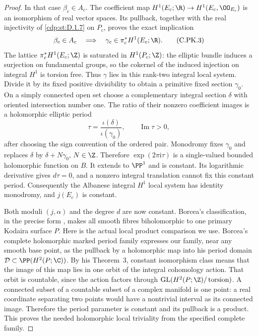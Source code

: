 \begin{proof}
In that case $\beta_c\in A_c$. The coefficient map
$H^1(E_c;\R)\to H^1(E_c,\OO_{E_c})$ is an isomorphism
of real vector spaces. Its pullback, together with the real
injectivity of \ref{cdp:st:D.1.7} on $P_c$, proves the exact implication
\[
 \beta_c\in A_c
 \quad\Longrightarrow\quad
 \gamma_c\in\pi_c^*H^1(E_c;\R).
\tag{C.PK.3}\label{cdp:eq:C.PK.3}
\]
The lattice $\pi_c^*H^1(E_c;\Z)$ is saturated in
$H^1(P_c;\Z)$: the elliptic bundle induces a surjection
on fundamental groups, so the cokernel of the induced
injection on integral $H^1$ is torsion free. Thus $\gamma$
lies in this rank-two integral local system. Divide it by
its fixed positive divisibility to obtain a primitive fixed
section $\gamma_0$. On a simply connected open set choose
a complementary integral section $\delta$ with oriented
intersection number one. The ratio of their nonzero
coefficient images is a holomorphic elliptic period
\[
 \tau=\frac{\iota(\delta)}{\iota(\gamma_0)},
 \qquad \operatorname{Im}\tau>0,
\]
after choosing the sign convention of the ordered pair.
Monodromy fixes $\gamma_0$ and replaces $\delta$ by
$\delta+N\gamma_0$, $N\in\Z$. Therefore
$\exp(2\pi\mathrm i\tau)$ is a single-valued bounded
holomorphic function on $B$. It extends to $\PP^1$ and
is constant. Its logarithmic derivative gives $d\tau=0$,
and a nonzero integral translation cannot fix this constant
period. Consequently the Albanese integral $H^1$ local
system has identity monodromy, and $j(E_c)$ is constant.

Both moduli $(j,\alpha)$ and the degree $d$ are now
constant. Borcea's classification, in the precise form
\cite[\S1]{SS2002}, makes all smooth fibres biholomorphic
to one primary Kodaira surface $P$. Here is the actual
local product comparison we use. Borcea's complete
holomorphic marked period family \cite[Remark~1]{Borcea1984}
expresses our family, near any smooth base point, as the
pullback by a holomorphic map into his period domain
$\mathcal D\subset\PP(H^2(P;\C))$. By his Theorem~3,
constant isomorphism class means that the image of this
map lies in one orbit of the integral cohomology action.
That orbit is countable, since the action factors through
$\operatorname{GL}(H^2(P;\Z)/\operatorname{torsion})$.
A connected subset of a countable subset of a complex
manifold is one point: a real coordinate separating two
points would have a nontrivial interval as its connected
image. Therefore the period parameter is constant and
its pullback is a product. This proves the needed
holomorphic local triviality from the specified complete
family.


\end{proof}
